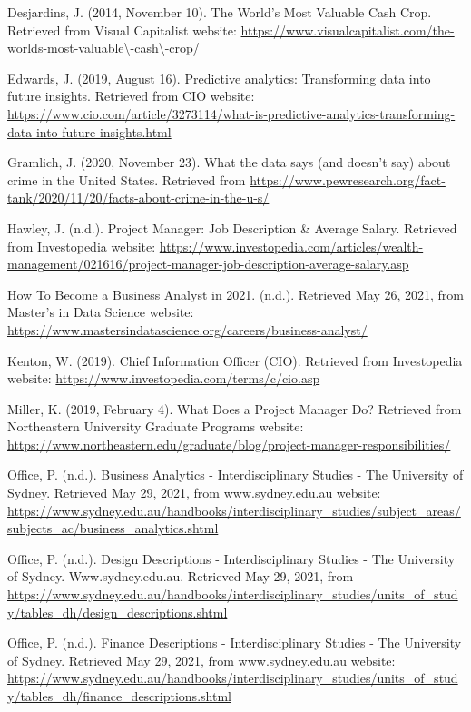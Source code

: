 \documentclass[12pt]{article}
\begin{document}
Desjardins, J. (2014, November 10). The World’s Most Valuable Cash Crop. Retrieved from Visual Capitalist website:
\url{https://www.visualcapitalist.com/the-worlds-most-valuable\-cash\-crop/}

Edwards, J. (2019, August 16). Predictive analytics: Transforming data into future insights. Retrieved from CIO website:
\url{https://www.cio.com/article/3273114/what-is-predictive-analytics-transforming-data-into-future-insights.html}

Gramlich, J. (2020, November 23). What the data says (and doesn't say) about crime in the United States. Retrieved from \url{https://www.pewresearch.org/fact-tank/2020/11/20/facts-about-crime-in-the-u-s/}

Hawley, J. (n.d.). Project Manager: Job Description \& Average Salary. Retrieved from Investopedia website:
\url{https://www.investopedia.com/articles/wealth-management/021616/project-manager-job-description-average-salary.asp}

How To Become a Business Analyst in 2021. (n.d.). Retrieved May 26, 2021, from Master’s in Data Science website:
\url{https://www.mastersindatascience.org/careers/business-analyst/}

Kenton, W. (2019). Chief Information Officer (CIO). Retrieved from Investopedia website:
\url{https://www.investopedia.com/terms/c/cio.asp}

Miller, K. (2019, February 4). What Does a Project Manager Do? Retrieved from Northeastern University Graduate Programs website:
\url{https://www.northeastern.edu/graduate/blog/project-manager-responsibilities/}

Office, P. (n.d.). Business Analytics - Interdisciplinary Studies - The University of Sydney. Retrieved May 29, 2021, from www.sydney.edu.au website:
\url{https://www.sydney.edu.au/handbooks/interdisciplinary\_studies/subject\_areas/subjects\_ac/business\_analytics.shtml}

Office, P. (n.d.). Design Descriptions - Interdisciplinary Studies - The University of Sydney. Www.sydney.edu.au. Retrieved May 29, 2021, from
\url{ https://www.sydney.edu.au/handbooks/interdisciplinary_studies/units_of_study/tables_dh/design_descriptions.shtml}

Office, P. (n.d.). Finance Descriptions - Interdisciplinary Studies - The University of Sydney. Retrieved May 29, 2021, from www.sydney.edu.au website:
\url{https://www.sydney.edu.au/handbooks/interdisciplinary\_studies/units\_of\_study/tables\_dh/finance\_descriptions.shtml}
\end{document}
